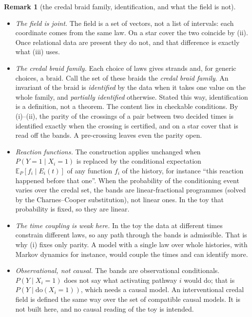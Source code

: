 \documentclass[11pt]{article}
\theoremstyle{definition}\newtheorem{definition}[theorem]{Definition}\newtheorem{remark}[theorem]{Remark}\newtheorem{example}[theorem]{Example}\newtheorem{problem}[theorem]{Open problem}\crefname{problem}{Problem}{Problems}
\begin{document}
\begin{remark}[the credal braid family, identification, and what the field is not]\label{rem:credalbraidfamily}
\begin{itemize}
\item \emph{The field is joint.} The field is a set of vectors, not a list of intervals: each coordinate comes from the same law. On a star cover the two coincide by (ii). Once relational data are present they do not, and that difference is exactly what (iii) uses.
\item \emph{The credal braid family.} Each choice of laws gives strands and, for generic choices, a braid. Call the set of these braids the \emph{credal braid family}. An invariant of the braid is \emph{identified} by the data when it takes one value on the whole family, and \emph{partially identified} otherwise. Stated this way, identification is a definition, not a theorem. The content lies in checkable conditions. By (i)--(ii), the parity of the crossings of a pair between two decided times is identified exactly when the crossing is certified, and on a star cover that is read off the bands. A pre-crossing leaves even the parity open.
\item \emph{Reaction functions.} The construction applies unchanged when $P(Y=1\mid X_i=1)$ is replaced by the conditional expectation $\mathbb E_P[f_i\mid E_i(t)]$ of any function $f_i$ of the history, for instance ``this reaction happened before that one''. When the probability of the conditioning event varies over the credal set, the bands are linear-fractional programmes (solved by the Charnes--Cooper substitution), not linear ones. In the toy that probability is fixed, so they are linear.
\item \emph{The time coupling is weak here.} In the toy the data at different times constrain different laws, so any path through the bands is admissible. That is why (i) fixes only parity. A model with a single law over whole histories, with Markov dynamics for instance, would couple the times and can identify more.
\item \emph{Observational, not causal.} The bands are observational conditionals. $P(Y\mid X_i=1)$ does not say what activating pathway $i$ would do; that is $P(Y\mid\mathrm{do}(X_i=1))$, which needs a causal model. An interventional credal field is defined the same way over the set of compatible causal models. It is not built here, and no causal reading of the toy is intended.
\end{itemize}
\end{remark}
\end{document}
